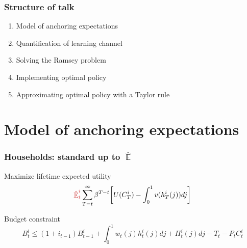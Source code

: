 \documentclass[10pt]{beamer}
\DeclareMathOperator{\E}{\mathbb{E}}
\begin{document}
\begin{frame}
	\frametitle{Structure of talk}

\setlength{\leftmargini}{12pt}
\begin{enumerate}
\item \hspace{-0.15cm} Model of anchoring expectations

\vspace{0.75cm}

\item \hspace{-0.15cm} Quantification of learning channel

\vspace{0.75cm}

\item \hspace{-0.15cm} Solving the Ramsey problem

\vspace{0.75cm}

\item \hspace{-0.15cm} Implementing optimal policy

\vspace{0.75cm}

\item \hspace{-0.15cm} Approximating optimal policy with a Taylor rule



\end{enumerate}


\end{frame}

\section{Model of anchoring expectations}

\begin{frame}
	\frametitle{Households: standard up to $\hat{\E}$}
	\label{HH}

Maximize lifetime expected utility
\begin{equation}
\textcolor{brownreddark}{\hat{\E}^i_t}\sum^{\infty}_{T=t}\beta^{T-t} \bigg[ U(C^i_T) - \int_0^1 v(h^i_T(j)) dj \bigg]
\label{lifetime_U}
\end{equation}	

Budget constraint
\begin{equation}
 B^i_t \leq (1+i_{t-1})B^i_{t-1} + \int_0^1 w_t(j)h^i_t(j) dj + \Pi_t^i(j)  dj-T_t -P_tC^i_t
 \label{BC}
\end{equation}



\vfill

\hfill \hyperlink{details_HHs_firms}{}
\end{frame}
\end{document}
